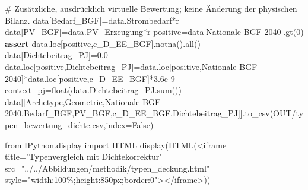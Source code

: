 \documentclass[
  ngerman,
  a4paper,
  DIV=11]{scrreprt}
\newenvironment{Shaded}{\begin{snugshade}}{\end{snugshade}}
\newcommand{\BuiltInTok}[1]{\textcolor[rgb]{0.00,0.23,0.31}{#1}}
\newcommand{\CommentTok}[1]{\textcolor[rgb]{0.37,0.37,0.37}{#1}}
\newcommand{\ControlFlowTok}[1]{\textcolor[rgb]{0.00,0.23,0.31}{\textbf{#1}}}
\newcommand{\DecValTok}[1]{\textcolor[rgb]{0.68,0.00,0.00}{#1}}
\newcommand{\FloatTok}[1]{\textcolor[rgb]{0.68,0.00,0.00}{#1}}
\newcommand{\ImportTok}[1]{\textcolor[rgb]{0.00,0.46,0.62}{#1}}
\newcommand{\NormalTok}[1]{\textcolor[rgb]{0.00,0.23,0.31}{#1}}
\newcommand{\OperatorTok}[1]{\textcolor[rgb]{0.37,0.37,0.37}{#1}}
\newcommand{\StringTok}[1]{\textcolor[rgb]{0.13,0.47,0.30}{#1}}
\newcommand{\VariableTok}[1]{\textcolor[rgb]{0.07,0.07,0.07}{#1}}
\begin{document}
\begin{Shaded}
\begin{Highlighting}[]
\CommentTok{\# Zusätzliche, ausdrücklich virtuelle Bewertung; keine Änderung der physischen Bilanz.}
\NormalTok{data[}\StringTok{\textquotesingle{}Bedarf\_BGF\textquotesingle{}}\NormalTok{]}\OperatorTok{=}\NormalTok{data.Strombedarf}\OperatorTok{*}\NormalTok{r}
\NormalTok{data[}\StringTok{\textquotesingle{}PV\_BGF\textquotesingle{}}\NormalTok{]}\OperatorTok{=}\NormalTok{data.PV\_Erzeugung}\OperatorTok{*}\NormalTok{r}
\NormalTok{positive}\OperatorTok{=}\NormalTok{data[}\StringTok{\textquotesingle{}Nationale BGF 2040\textquotesingle{}}\NormalTok{].gt(}\DecValTok{0}\NormalTok{)}
\ControlFlowTok{assert}\NormalTok{ data.loc[positive,}\StringTok{\textquotesingle{}c\_D\_EE\_BGF\textquotesingle{}}\NormalTok{].notna().}\BuiltInTok{all}\NormalTok{()}
\NormalTok{data[}\StringTok{\textquotesingle{}Dichtebeitrag\_PJ\textquotesingle{}}\NormalTok{]}\OperatorTok{=}\FloatTok{0.0}
\NormalTok{data.loc[positive,}\StringTok{\textquotesingle{}Dichtebeitrag\_PJ\textquotesingle{}}\NormalTok{]}\OperatorTok{=}\NormalTok{data.loc[positive,}\StringTok{\textquotesingle{}Nationale BGF 2040\textquotesingle{}}\NormalTok{]}\OperatorTok{*}\NormalTok{data.loc[positive,}\StringTok{\textquotesingle{}c\_D\_EE\_BGF\textquotesingle{}}\NormalTok{]}\OperatorTok{*}\FloatTok{3.6e{-}9}
\NormalTok{context\_pj}\OperatorTok{=}\BuiltInTok{float}\NormalTok{(data.Dichtebeitrag\_PJ.}\BuiltInTok{sum}\NormalTok{())}
\NormalTok{data[[}\StringTok{\textquotesingle{}Archetype\textquotesingle{}}\NormalTok{,}\StringTok{\textquotesingle{}Geometrie\textquotesingle{}}\NormalTok{,}\StringTok{\textquotesingle{}Nationale BGF 2040\textquotesingle{}}\NormalTok{,}\StringTok{\textquotesingle{}Bedarf\_BGF\textquotesingle{}}\NormalTok{,}\StringTok{\textquotesingle{}PV\_BGF\textquotesingle{}}\NormalTok{,}\StringTok{\textquotesingle{}c\_D\_EE\_BGF\textquotesingle{}}\NormalTok{,}\StringTok{\textquotesingle{}Dichtebeitrag\_PJ\textquotesingle{}}\NormalTok{]].to\_csv(OUT}\OperatorTok{/}\StringTok{\textquotesingle{}typen\_bewertung\_dichte.csv\textquotesingle{}}\NormalTok{,index}\OperatorTok{=}\VariableTok{False}\NormalTok{)}

\ImportTok{from}\NormalTok{ IPython.display }\ImportTok{import}\NormalTok{ HTML}
\NormalTok{display(HTML(}\StringTok{\textquotesingle{}\textless{}iframe title="Typenvergleich mit Dichtekorrektur" src="../../Abbildungen/methodik/typen\_deckung.html" style="width:100\%;height:850px;border:0"\textgreater{}\textless{}/iframe\textgreater{}\textquotesingle{}}\NormalTok{))}
\end{Highlighting}
\end{Shaded}
\end{document}

